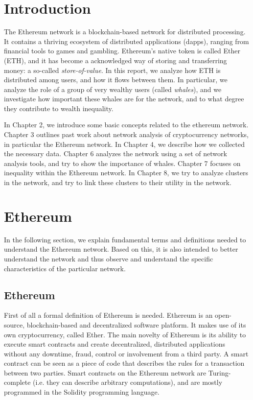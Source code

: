 \documentclass[10pt,a4paper]{article}
\begin{document}
\begin{multicols}{2}
\section{Introduction}
The Ethereum network is a blockchain-based network for distributed processing. It contains a thriving ecosystem of distributed applications (dapps), ranging from financial tools to games and gambling. Ethereum's native token is called Ether (ETH), and it has become a acknowledged way of storing and transferring money: a so-called \textit{store-of-value}. In this report, we analyze how ETH is distributed among users, and how it flows between them. In particular, we analyze the role of a group of very wealthy users (called \textit{whales}), and we investigate how important these whales are for the network, and to what degree they contribute to wealth inequality.

In Chapter 2, we introduce some basic concepts related to the ethereum network. Chapter 3 outlines past work about network analysis of cryptocurrency networks, in particular the Ethereum network. In Chapter 4, we describe how we collected the necessary data. Chapter 6 analyzes the network using a set of network analysis tools, and try to show the importance of whales. Chapter 7 focuses on inequality within the Ethereum network. In Chapter 8, we try to analyze clusters in the network, and try to link these clusters to their utility in the network. 

\section{Ethereum}

In the following section, we explain fundamental terms and definitions needed to understand the Ethereum network. Based on this, it is also intended to better understand the network and thus observe and understand the specific characteristics of the particular network. 

\subsection{Ethereum}
First of all a formal definition of Ethereum is needed. Ethereum is an open-source, blockchain-based and decentralized software platform. It makes use of its own cryptocurrency, called Ether. The main novelty of Ethereum is its ability to execute smart contracts and create decentralized, distributed applications without any downtime, fraud, control or involvement from a third party. A smart contract can be seen as a piece of code that describes the rules for a transaction between two parties. Smart contracts on the Ethereum network are Turing-complete (i.e. they can describe arbitrary computations), and are mostly programmed in the Solidity programming language. 

\end{multicols}
\end{document}
